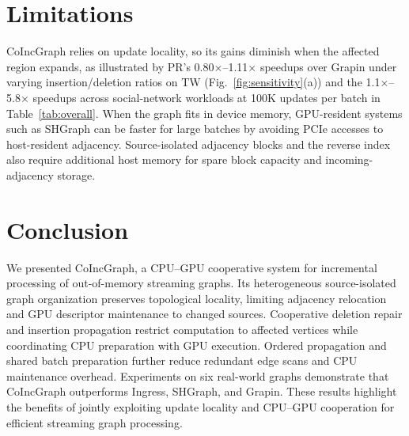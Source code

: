 \section{Limitations}
CoIncGraph relies on update locality, so its gains diminish when the affected region expands, as illustrated by PR's 0.80$\times$--1.11$\times$ speedups over Grapin under varying insertion/deletion ratios on TW (Fig.~\ref{fig:sensitivity}(a)) and the 1.1$\times$--5.8$\times$ speedups across social-network workloads at 100K updates per batch in Table~\ref{tab:overall}.
When the graph fits in device memory, GPU-resident systems such as SHGraph can be faster for large batches by avoiding PCIe accesses to host-resident adjacency.
Source-isolated adjacency blocks and the reverse index also require additional host memory for spare block capacity and incoming-adjacency storage.

\section{Conclusion}
We presented CoIncGraph, a CPU--GPU cooperative system for incremental processing of out-of-memory streaming graphs. Its heterogeneous source-isolated graph organization preserves topological locality, limiting adjacency relocation and GPU descriptor maintenance to changed sources. Cooperative deletion repair and insertion propagation restrict computation to affected vertices while coordinating CPU preparation with GPU execution. Ordered propagation and shared batch preparation further reduce redundant edge scans and CPU maintenance overhead. Experiments on six real-world graphs demonstrate that CoIncGraph outperforms Ingress, SHGraph, and Grapin. These results highlight the benefits of jointly exploiting update locality and CPU--GPU cooperation for efficient streaming graph processing.
